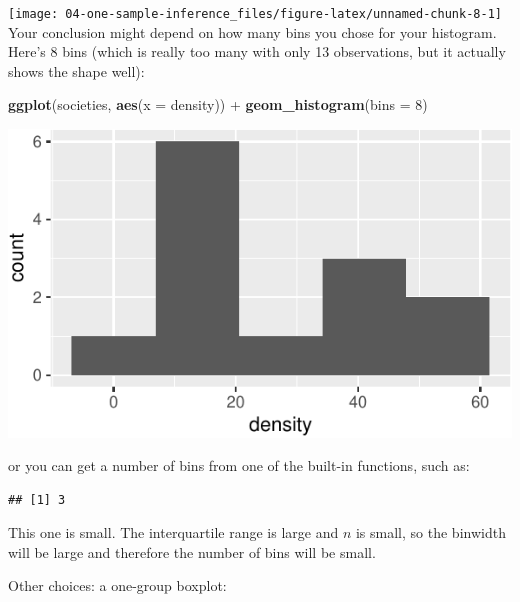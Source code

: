 \documentclass[]{tufte-book}
\newenvironment{Shaded}{}{}
\newcommand{\DataTypeTok}[1]{\textcolor[rgb]{0.56,0.13,0.00}{#1}}
\newcommand{\DecValTok}[1]{\textcolor[rgb]{0.25,0.63,0.44}{#1}}
\newcommand{\KeywordTok}[1]{\textcolor[rgb]{0.00,0.44,0.13}{\textbf{#1}}}
\newcommand{\NormalTok}[1]{#1}
\newcommand{\OperatorTok}[1]{\textcolor[rgb]{0.40,0.40,0.40}{#1}}
\newcommand{\StringTok}[1]{\textcolor[rgb]{0.25,0.44,0.63}{#1}}
\theoremstyle{definition}
\theoremstyle{definition}
\theoremstyle{definition}
\theoremstyle{remark}
\begin{document}
\texttt{[image: 04-one-sample-inference\_files/figure-latex/unnamed-chunk-8-1]}
Your conclusion might depend on how many bins you chose for your
histogram. Here's 8 bins (which is really too many with only 13
observations, but it actually shows the shape well):

\begin{Shaded}
\begin{Highlighting}[]
\KeywordTok{ggplot}\NormalTok{(societies, }\KeywordTok{aes}\NormalTok{(}\DataTypeTok{x =}\NormalTok{ density)) }\OperatorTok{+}\StringTok{ }\KeywordTok{geom_histogram}\NormalTok{(}\DataTypeTok{bins =} \DecValTok{8}\NormalTok{)}
\end{Highlighting}
\end{Shaded}

\includegraphics{04-one-sample-inference_files/figure-latex/unnamed-chunk-9-1}

or you can get a number of bins from one of the built-in functions, such
as:

\begin{Shaded}
\end{Shaded}

\begin{verbatim}
## [1] 3
\end{verbatim}

This one is small. The interquartile range is large and \(n\) is small,
so the binwidth will be large and therefore the number of bins will be
small.

Other choices: a one-group boxplot:
\end{document}

